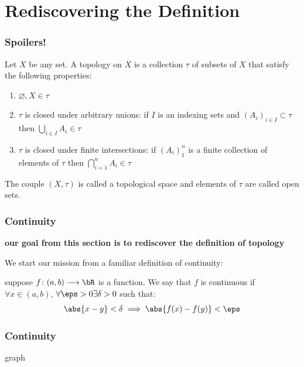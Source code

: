 \documentclass{beamer}
\begin{document}
\section{Rediscovering the Definition}

\begin{frame}
    \frametitle{Spoilers!}

    \begin{definition}
        Let $X$ be any set. A topology on $X$ is a collection $\tau$ of subsets of $X$ that satisfy the following properties: \pause
        \begin{enumerate}
            \item $\varnothing, X\in \tau$
            \item $\tau$ is closed under arbitrary unions: if $I$ is an indexing sets and $(A_i)_{i\in I}\subset \tau$ then
            $\bigcup_{i\in I} A_i\in \tau$
            \item $\tau$ is closed under finite intersections: if $(A_i)_1^n$ is a finite collection of elements of $\tau$ then
            $\bigcap_{i=1}^n A_i\in\tau$
        \end{enumerate}\pause
        The couple $(X, \tau)$ is called a topological space and elements of $\tau$ are called open sets.
    \end{definition}

\end{frame}

\begin{frame}[label=continuity]
    \frametitle{Continuity}

    \textbf{our goal from this section is to rediscover the definition of topology}
    \pause

    We start our mission from a familiar definition of continuity: \pause
    \begin{definition}
        suppose $f\colon(a, b)\longrightarrow\bR$ is a function. We say that $f$ is continuous if $\forall x\in(a, b)$, $\forall\eps>0\exists\delta>0$ 
        such that:
        \[\abs{x-y}<\delta \implies \abs{f(x)-f(y)}<\eps\]
    \end{definition}
    
\end{frame}

\begin{frame}
    \frametitle{Continuity}

    \begin{block}{graph}
        \vspace{5cm}
    \end{block}

\end{frame}
\end{document}
